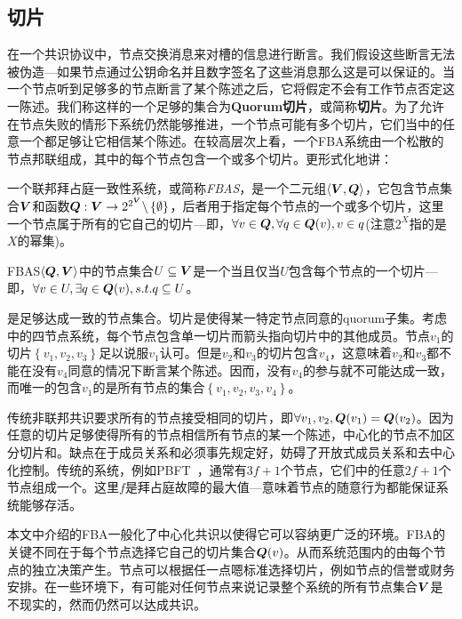 \subsection{{\quorum}切片}

在一个共识协议中，节点交换消息来对槽的信息进行断言。我们假设这些断言无法被伪造---如果节点通过公钥命名并且数字签名了这些消息那么这是可以保证的。当一个节点听到足够多的节点断言了某个陈述之后，它将假定不会有工作节点否定这一陈述。我们称这样的一个足够的集合为\textbf{Quorum切片}，或简称\textbf{切片}。为了允许在节点失败的情形下系统仍然能够推进，一个节点可能有多个切片，它们当中的任意一个都足够让它相信某个陈述。在较高层次上看，一个FBA系统由一个松散的节点邦联组成，其中的每个节点包含一个或多个切片。更形式化地讲：

\begin{definition}[FBAS]
	一个联邦拜占庭一致性系统，或简称\textit{FBAS}，是一个二元组$\langle{\bm V}, {\bm Q}\rangle$，它包含节点集合${\bm V}$和{\quorum}函数${\bm Q}:{\bm V}\rightarrow2^{2^{{\bm V}}}\backslash\left\{\emptyset\right\}$，后者用于指定每个节点的一个或多个切片，这里一个节点属于所有的它自己的切片---即，$\forall v\in{\bm Q},\forall q\in{{\bm Q}(v)},v\in q$(注意$2^X$指的是$X$的幂集)。
\end{definition}

\begin{definition}[\quorum]
	FBAS$\langle{\bm Q},{\bm V}\rangle$中的节点集合$U\subseteq{\bm V}$是一个\textit{\quorum}当且仅当$U$包含每个节点的一个切片---即，$\forall v\in U, \exists q \in {\bm Q}(v), s.t. q\subseteq U$。
\end{definition}

{\quorum}是足够达成一致的节点集合。切片是使得某一特定节点同意的quorum子集。考虑中的四节点系统，每个节点包含单一切片而箭头指向切片中的其他成员。节点$v_1$的切片$\left\{v_1,v_2,v_3\right\}$足以说服$v_1$认可。但是$v_2$和$v_3$的切片包含$v_4$，这意味着$v_2$和$v_3$都不能在没有$v_4$同意的情况下断言某个陈述。因而，没有$v_4$的参与就不可能达成一致，而唯一的包含$v_1$的{\quorum}是所有节点的集合$\left\{v_1,v_2,v_3,v_4\right\}$。

传统非联邦共识要求所有的节点接受相同的切片，即$\forall v_1, v_2, {\bm Q}(v_1)={\bm Q}(v_2)$。因为任意的切片足够使得所有的节点相信所有节点的某一个陈述，中心化的节点不加区分切片和{\quorum}。缺点在于成员关系和{\quorum}必须事先规定好，妨碍了开放式成员关系和去中心化控制。传统的系统，例如PBFT~\cite{Castro:1999:PBFT}，通常有$3f+1$个节点，它们中的任意$2f+1$个节点组成一个{\quorum}。这里$f$是拜占庭故障的最大值---意味着节点的随意行为都能保证系统能够存活。

本文中介绍的FBA一般化了中心化共识以使得它可以容纳更广泛的环境。FBA的关键不同在于每个节点选择它自己的{\quorum}切片集合${\bm Q}(v)$。从而系统范围内的{\quorum}由每个节点的独立决策产生。节点可以根据任一点嗯标准选择切片，例如节点的信誉或财务安排。在一些环境下，有可能对任何节点来说记录整个系统的所有节点集合${{\bm V}}$是不现实的，然而仍然可以达成共识。
